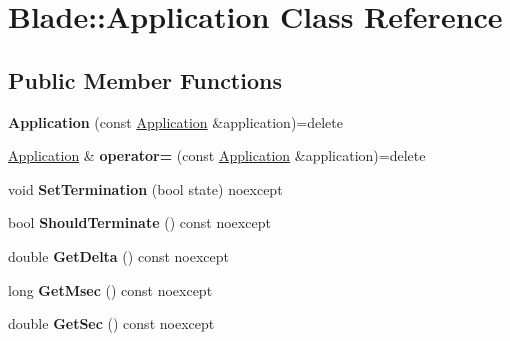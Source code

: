 \hypertarget{class_blade_1_1_application}{}\section{Blade\+:\+:Application Class Reference}
\label{class_blade_1_1_application}
\subsection*{Public Member Functions}
\begin{DoxyCompactItemize}
\item 
\mbox{\label{class_blade_1_1_application_a73ea9e8a20297c3dd47a565302e46b10}} 
{\bfseries Application} (const \hyperlink{class_blade_1_1_application}{Application} \&application)=delete
\item 
\mbox{\label{class_blade_1_1_application_ad7528afe280f12aa19f0dcbefd5083aa}} 
\hyperlink{class_blade_1_1_application}{Application} \& {\bfseries operator=} (const \hyperlink{class_blade_1_1_application}{Application} \&application)=delete
\item 
\mbox{\label{class_blade_1_1_application_a74d0bed9493b107ac522db1a40ebe19d}} 
void {\bfseries Set\+Termination} (bool state) noexcept
\item 
\mbox{\label{class_blade_1_1_application_a68aba5838320ebb7b2683954ffee050b}} 
bool {\bfseries Should\+Terminate} () const noexcept
\item 
\mbox{\label{class_blade_1_1_application_a8e144f5f05fc638339fc19afe142bbab}} 
double {\bfseries Get\+Delta} () const noexcept
\item 
\mbox{\label{class_blade_1_1_application_a0fd401f7a7ea78a8d222ccc920cb1968}} 
long {\bfseries Get\+Msec} () const noexcept
\item 
\mbox{\label{class_blade_1_1_application_a025118e872031944df57560e820cfde2}} 
double {\bfseries Get\+Sec} () const noexcept
\item 
\mbox{\label{class_blade_1_1_application_a3c8f0f5698682bd2b205ae1616020073}} 

\end{DoxyCompactItemize}

